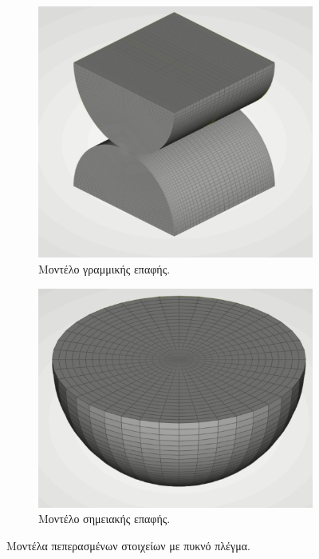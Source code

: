 \documentclass{article}
\begin{document}
\begin{figure}[H]
    \centering
    \begin{subfigure}{0.49\linewidth}
        \centering
        \includegraphics[width=0.7\linewidth]{media/lfine.png}
        \caption{Μοντέλο γραμμικής επαφής.}
    \end{subfigure}
    \hfill
    \begin{subfigure}{0.49\linewidth}
        \centering
        \includegraphics[width=0.8\linewidth]{media/pfine.png}
        \caption{Μοντέλο σημειακής επαφής.}
    \end{subfigure}
    \caption{Μοντέλα πεπερασμένων στοιχείων με πυκνό πλέγμα.}
    \label{fig:mod2}
\end{figure}
\end{document}

